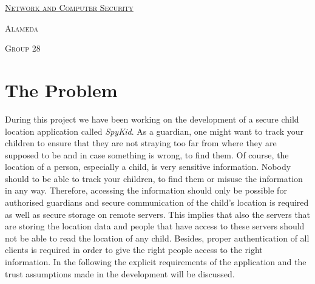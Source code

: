 \documentclass[a4paper]{article}
\begin{document}
\begin{titlepage}

    \begin{center}
        \begin{minipage}{0.75\linewidth}
            \centering
            \vspace{1.5cm}
            \href{https://fenix.tecnico.ulisboa.pt/disciplinas/SIRS7/2019-2020/1-semestre}
            {\scshape\LARGE Network and Computer Security} \par
            \vspace{1cm}
            {\scshape\Large Alameda} \par
            \vspace{1cm}
            {\scshape\Large Group 28} \par
            \vspace{1.5cm}

            \maketitle
        \end{minipage}
    \end{center}

\end{titlepage}

\tableofcontents
\thispagestyle{empty}
\newpage
\setcounter{page}{1}

\pagebreak

\section{The Problem}
During this project we have been working on the development of a secure child location application called \emph{SpyKid}. As a guardian, one might want to track your children to ensure that they are not straying too far from where they are supposed to be and in case something is wrong, to find them. Of course, the location of a person, especially a child, is very sensitive information. Nobody should to be able to track your children, to find them or misuse the information in any way. Therefore, accessing the information should only be possible for authorised guardians and secure communication of the child's location is required as well as secure storage on remote servers. This implies that also the servers that are storing the location data and people that have access to these servers should not be able to read the location of any child. Besides, proper authentication of all clients is required in order to give the right people access to the right information. In the following the explicit requirements of the application and the trust assumptions made in the development will be discussed. 
\end{document}
